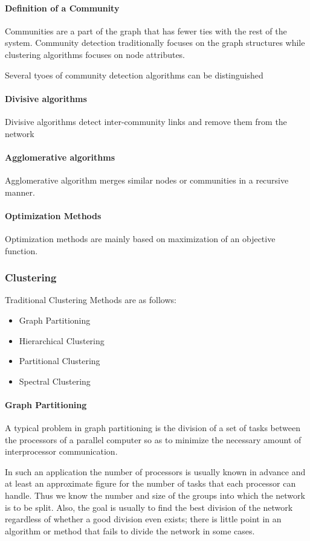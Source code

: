 \paragraph{Definition of a Community}
Communities are a part of the graph that has fewer ties with the rest of the system. Community detection traditionally focuses on the graph structures while clustering algorithms focuses on node attributes. 

Several tyoes of community detection algorithms can be distinguished
\paragraph{Divisive algorithms}
Divisive algorithms detect inter-community links and remove them from the network

\paragraph{Agglomerative algorithms}
Agglomerative algorithm merges similar nodes or communities in a recursive manner.

\paragraph{Optimization Methods}
Optimization methods are mainly based on maximization of an objective function.




\subsubsection{Clustering}

Traditional Clustering Methods are as follows:
\begin{itemize}

\item Graph Partitioning 

\item Hierarchical Clustering

\item Partitional Clustering

\item Spectral Clustering

\end{itemize}

\paragraph{Graph Partitioning}
 A typical problem in graph partitioning is the division of a set of tasks between the processors of a parallel computer so as to minimize the necessary amount of interprocessor communication.
 \par In such an application the number of processors is usually known in advance and at least an approximate figure for the number of tasks that each processor can handle. Thus we know the number and size of the groups into which the network is to be split. Also, the goal is usually to find the best division of the network regardless of whether a good division even exists; there is little point in an algorithm or method that fails to divide the network in some cases.\cite{newman2006modularity}

